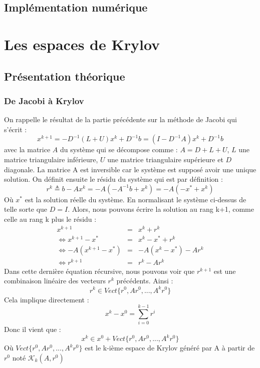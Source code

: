 \subsection{Implémentation numérique}
\section{Les espaces de Krylov}
\subsection{Présentation théorique}
\subsubsection{De Jacobi à Krylov}
On rappelle le résultat de la partie précédente sur la méthode de Jacobi qui s'écrit : 
\begin{equation}
x^{k+1} = -D^{-1}(L+U)x^k + D^{-1}b = (I - D^{-1}A)x^{k} + D^{-1}b
\end{equation}
avec la matrice $A$ du système qui se décompose comme : $A = D + L + U$, $L$ une matrice triangulaire inférieure, $U$ une matrice triangulaire supérieure et $D$ diagonale. La matrice A est inversible car le système est supposé avoir une unique solution. On définit ensuite le résidu du système qui est par définition : 
\begin{equation}
r^k \triangleq b - Ax^k = -A ( - A^{-1}b + x^k) = -A (- x^* + x^k)
\end{equation}
Où $x^*$ est la solution réelle du système. En normalisant le système ci-dessus de telle sorte que $D = I$. Alors, nous pouvons écrire la solution au rang k+1, comme celle au rang k plus le résidu : 
\begin{eqnarray}
x^{k+1} &=& x^k + r^k\\
\Leftrightarrow x^{k+1} - x^* &=& x^k - x^* + r^k\\
\Leftrightarrow -A( x^{k+1} - x^*) &=& -A(x^k - x^*) - Ar^k\\
\Leftrightarrow r^{k+1} &=& r^k - Ar^k
\end{eqnarray}
Dans cette dernière équation récursive, nous pouvons voir que $r^{k+1}$ est une combinaison linéaire des vecteurs $r^k$ précédents. Ainsi :
\begin{equation}
r^k \in Vect\{r^0, Ar^0, ..., A^kr^0\}
\end{equation}
Cela implique directement : 
\begin{equation}
x^k - x^0 = \sum_{i = 0}^{k-1}r^i
\end{equation}
Donc il vient que : 
\begin{equation}
x^k \in x^0 + Vect\{r^0, Ar^0, ..., A^kr^0\}
\end{equation}
Où $Vect\{r^0, Ar^0, ..., A^kr^0\}$ est le k-ième espace de Krylov généré par A à partir de $r^0$ noté $\mathcal{K}_k(A, r^0)$
